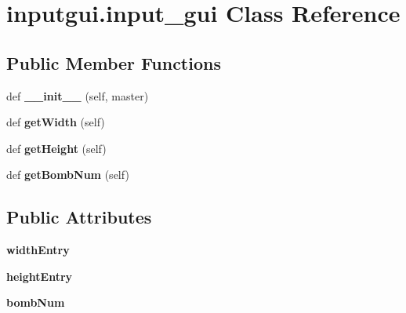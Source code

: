 \hypertarget{classinputgui_1_1input__gui}{}\section{inputgui.\+input\+\_\+gui Class Reference}
\label{classinputgui_1_1input__gui}
\subsection*{Public Member Functions}
\begin{DoxyCompactItemize}
\item 
\mbox{\label{classinputgui_1_1input__gui_aefb852b5803aa23d57411d4d6e3c3e21}} 
def {\bfseries \+\_\+\+\_\+init\+\_\+\+\_\+} (self, master)
\item 
\mbox{\label{classinputgui_1_1input__gui_a38a5320df086719d5b2189579a475014}} 
def {\bfseries get\+Width} (self)
\item 
\mbox{\label{classinputgui_1_1input__gui_a1e76e4a91c56e76eb603bb7c25fff529}} 
def {\bfseries get\+Height} (self)
\item 
\mbox{\label{classinputgui_1_1input__gui_a1530d308b35d159e7f72c81a2573b39a}} 
def {\bfseries get\+Bomb\+Num} (self)
\end{DoxyCompactItemize}
\subsection*{Public Attributes}
\begin{DoxyCompactItemize}
\item 
\mbox{\label{classinputgui_1_1input__gui_aadd10bb21e23a091e0042fb5427eb3a3}} 
{\bfseries width\+Entry}
\item 
\mbox{\label{classinputgui_1_1input__gui_a458f0727584c0852660fcb1edea62dee}} 
{\bfseries height\+Entry}
\item 
\mbox{\label{classinputgui_1_1input__gui_a1e4a683d7fc20cb42b70da688ac3b240}} 
{\bfseries bomb\+Num}
\end{DoxyCompactItemize}


